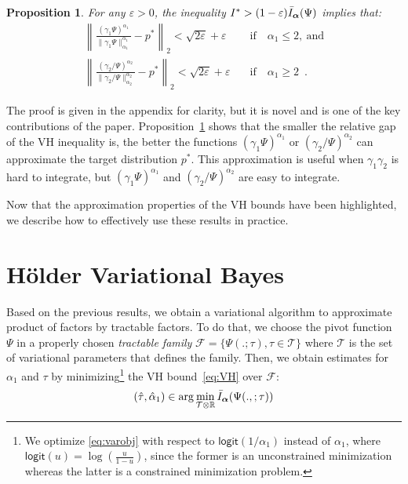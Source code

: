 \documentclass{article} %
\newcommand{\Holder}{H\"older\xspace}
\newcommand{\tauspace}{\mathcal{T}}
\def\proba{p}
\newcommand{\logit}{\mathsf{logit}}
\renewcommand{\Re}{\mathbb{R}}
\newtheorem{proposition}{Proposition}
\begin{document}
\begin{proposition}  
\label{th:approx}
For any $\varepsilon>0$, the inequality $I^* > (1-\varepsilon) \bar I_{\bm{\alpha}}(\Psi)$ implies that:
\begin{align}
\left\|
	\frac{(\gamma_1\Psi)^{\alpha_1}}{\|\gamma_1\Psi\|^{\alpha_1}_{\alpha_1}} 
	- 
	\proba^*
\right\|_2 < \sqrt{2\varepsilon} + \varepsilon
\quad &  \mathrm{if} \quad \alpha_1 \le 2, \mathrm{\ and}
\\
\left\|
	\frac{(\gamma_2/\Psi)^{\alpha_2}}{\|\gamma_2/\Psi\|^{\alpha_2}_{\alpha_2}} 
	- 
	\proba^*
\right\|_2 < \sqrt{2\varepsilon} + \varepsilon
\quad  & \mathrm{if} \quad \alpha_1 \ge 2
\enspace.
\end{align}
\end{proposition} 
The proof is given in the appendix for clarity, but it is novel and is one of the key contributions of the paper. 
Proposition~\ref{th:approx} shows that the smaller the relative gap of the VH inequality is, the better the functions $(\gamma_1 \Psi)^{\alpha_1}$ or $(\gamma_2/\Psi)^{\alpha_2}$ can approximate the target distribution $p^*$. This approximation is useful when $\gamma_1\gamma_2$ is hard to integrate, but $(\gamma_1 \Psi)^{\alpha_1}$ and $(\gamma_2/\Psi)^{\alpha_2}$ are easy to integrate.

Now that the approximation properties of the VH bounds have been highlighted, we describe how to effectively use these results in practice.


\section{\Holder Variational Bayes}
Based on the previous results, we obtain a variational algorithm to approximate product of factors by tractable factors.
To do that, we choose the pivot function $\Psi$ in a properly chosen \emph{tractable family} $\mathcal{F}=\{\Psi(.;\tau),\tau\in\tauspace\}$
 where $\tauspace$ is the set of variational parameters that defines the family.
Then, we obtain estimates for $\alpha_1$ and $\tau$ by minimizing\footnote{We optimize \eqref{eq:varobj} with respect to $\logit(1/\alpha_1)$ instead of $\alpha_1$, where $\logit(u)=\log(\frac{u}{1-u})$, since the former is an unconstrained minimization whereas the latter is a constrained minimization problem.}
 the VH bound~\eqref{eq:VH} over $\mathcal{F}$:
\begin{align}\label{eq:varobj}
  (\hat\tau,\hat\alpha_1) \in \arg\min_{\tauspace\otimes\Re} \bar I_\balpha(\Psi(.,;\tau))
\end{align}
\end{document}
